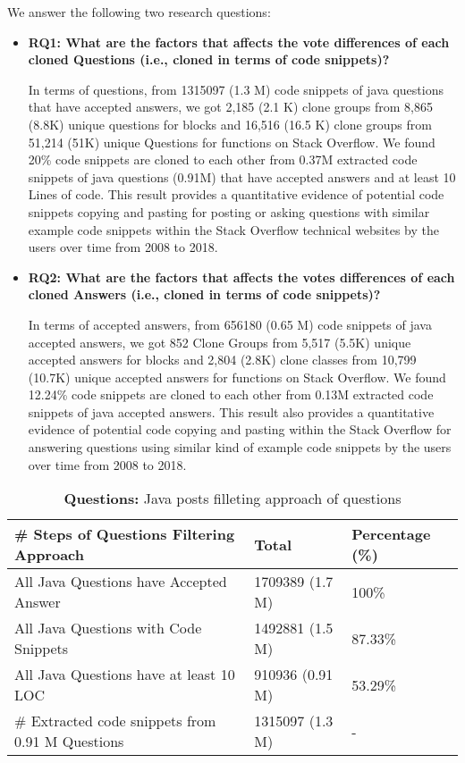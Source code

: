 \documentclass[conference]{IEEEtran}
\begin{document}
	We answer the following two research questions:
	\begin{itemize}
		\item \textbf{RQ1: What are the factors that affects the vote differences of each cloned Questions (i.e., cloned in terms of code snippets)?}
		
		In terms of questions, from 1315097 (1.3 M) code snippets of java questions that have accepted answers, we got 2,185 (2.1 K) clone groups from 8,865 (8.8K) unique questions for blocks and 16,516 (16.5 K) clone groups from 51,214 (51K) unique Questions for functions on Stack Overflow. We found 20\% code snippets are cloned to each other from 0.37M extracted code snippets of java questions (0.91M) that have accepted answers and at least 10 Lines of code. This result provides a quantitative evidence of potential code snippets copying and pasting for posting or asking questions with similar example code snippets within the Stack Overflow technical websites by the users over time from 2008 to 2018.
		\item \textbf{RQ2: What are the factors that affects the votes differences of each cloned Answers (i.e., cloned in terms of code snippets)?}
		
		In terms of accepted answers, from 656180 (0.65 M) code snippets of java accepted answers, we got 852 Clone Groups from 5,517  (5.5K)  unique accepted answers for blocks and 2,804 (2.8K)  clone classes from 10,799 (10.7K) unique accepted answers for functions on Stack Overflow. We found 12.24\% code snippets are cloned to each other from 0.13M extracted code snippets of java accepted answers. This result also provides a quantitative evidence of potential code copying and pasting within the Stack Overflow for answering questions using similar kind of example code snippets by the users over time from 2008 to 2018.
	\end{itemize}
	
	
	\begin{table*}[ht]
		\caption{\textbf{Questions:} Java posts filleting approach of questions}
		\centering
		\begin{tabular}{l l l }
			\hline\hline
			\# Steps of Questions Filtering Approach & Total & Percentage (\%) \\ [0.5ex]
			\hline
			All Java Questions have Accepted Answer & 1709389 (1.7 M) & 100\% \\
			All Java Questions with Code Snippets & 1492881 (1.5 M) & 87.33\% \\
			All Java Questions have at least 10 LOC  & 910936 (0.91 M) & 53.29\% \\
			\# Extracted code snippets from 0.91 M Questions &1315097 (1.3 M) & - \\  [1ex]
			\hline
		\end{tabular}
		\label{table:JavaQuestions}
	\end{table*}
	
\end{document}
